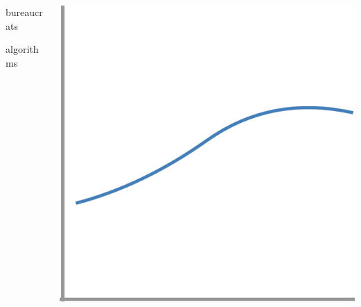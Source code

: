 \documentclass[presentation]{subfiles}
\begin{document}
\begin{frame}[t]

\vspace{4em}

\begin{columns}

\begin{column}{0.16\textwidth}

\vspace{-0em}

bureaucrats

\vspace{4em}

algorithms
\end{column}


\begin{column}{0.16\textwidth}
  {\includegraphics[width=\textwidth]{figures/slb_1.png}}
  

\end{column}
\end{columns}
\end{frame}
\end{document}
